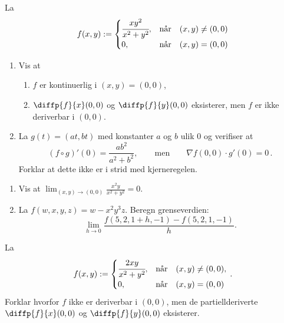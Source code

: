 
  
\oppgave[V2017, Oppgave 1] La
%
\begin{equation*}
  f(x, y) :=
  \begin{cases}
    \cfrac{xy^2}{x^2 + y^2}, & \text{når} \quad (x,y) \neq (0,0) \\
    0, & \text{når} \quad (x,y) = (0,0)
  \end{cases}
\end{equation*}

\begin{enumerate}
  \item Vis at
    \begin{enumerate}
      \item $f$ er kontinuerlig i $(x,y) = (0,0)$,
      \item $\diffp{f}{x}(0,0)$ og $\diffp{f}{y}(0,0)$ eksisterer, men $f$ er
        ikke deriverbar i $(0,0)$.
    \end{enumerate}
  \item La $g(t) = (at, bt)$ med konstanter $a$ og $b$ ulik $0$ og verifiser at
    \begin{equation*}
      (f \circ g)'(0) = \frac{ab^2}{a^2 + b^2},
      \qquad \text{men} \qquad 
      \nabla f(0,0) \cdot g'(0) = 0\,.
    \end{equation*}
    Forklar at dette ikke er i strid med kjerneregelen.
\end{enumerate}

\oppgave[K2016, Oppgave 1]

\begin{enumerate}
  \item Vis at $\displaystyle \lim_{(x,y) \to (0,0)} \frac{x^2y}{x^2 + y^2} =
    0$.
  \item La $f(w,x,y,z) = w - x^2y^3z$. Beregn grenseverdien:
    \begin{equation*}
      \lim_{h \to 0} \frac{f(5,2,1+h,-1) - f(5,2,1,-1)}{h}.
    \end{equation*}
\end{enumerate}


\oppgave[V2016, Oppgave 1] La
%
\begin{equation*}
  f(x, y) :=
  \begin{cases}
    \cfrac{2xy}{x^2 + y^2}, & \text{når} \quad (x,y) \neq (0,0), \\
    0, & \text{når} \quad (x,y) = (0,0)
  \end{cases}\,.
\end{equation*}
%
Forklar hvorfor $f$ ikke er deriverbar i $(0,0)$, men de partiellderiverte
$\diffp{f}{x}(0,0)$ og $\diffp{f}{y}(0,0)$ eksisterer.

